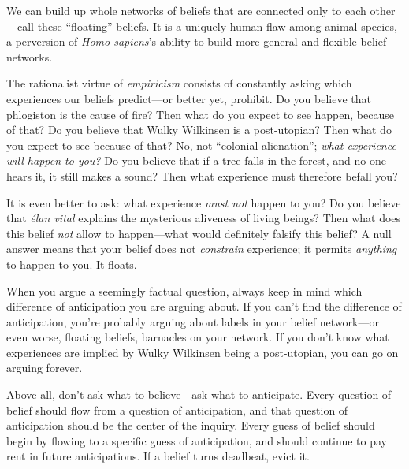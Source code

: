 {
 We can build up whole networks of beliefs that are connected only
to each other---call these
``floating'' beliefs. It is a
uniquely human flaw among animal species, a perversion of \textit{Homo
sapiens}'s ability to build more general and flexible
belief networks.}

{
 The rationalist virtue of \textit{empiricism} consists of
constantly asking which experiences our beliefs predict---or better
yet, prohibit. Do you believe that phlogiston is the cause of fire?
Then what do you expect to see happen, because of that? Do you believe
that Wulky Wilkinsen is a post-utopian? Then what do you expect to see
because of that? No, not ``colonial
alienation''; \textit{what experience will happen to
you?} Do you believe that if a tree falls in the forest, and no one
hears it, it still makes a sound? Then what experience must therefore
befall you?}

{
 It is even better to ask: what experience \textit{must not} happen
to you? Do you believe that \textit{élan vital} explains the mysterious
aliveness of living beings? Then what does this belief \textit{not}
allow to happen---what would definitely falsify this belief? A null
answer means that your belief does not \textit{constrain} experience;
it permits \textit{anything} to happen to you. It floats.}

{
 When you argue a seemingly factual question, always keep in mind
which difference of anticipation you are arguing about. If you
can't find the difference of anticipation,
you're probably arguing about labels in your belief
network---or even worse, floating beliefs, barnacles on your network.
If you don't know what experiences are implied by Wulky
Wilkinsen being a post-utopian, you can go on arguing forever.}

{
 Above all, don't ask what to believe---ask what to
anticipate. Every question of belief should flow from a question of
anticipation, and that question of anticipation should be the center of
the inquiry. Every guess of belief should begin by flowing to a
specific guess of anticipation, and should continue to pay rent in
future anticipations. If a belief turns deadbeat, evict it.}

\myendsectiontext

\label{a_fable_of_science_and_politics}

